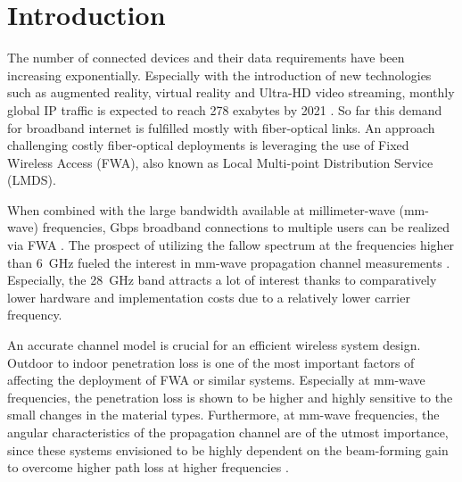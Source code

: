 \documentclass[conference]{IEEEtran}
\begin{document}
\section{Introduction}

The number of connected devices and their data requirements have been increasing exponentially. Especially with the introduction of new technologies such as augmented reality, virtual reality and Ultra-HD video streaming, monthly global IP traffic is expected to reach 278 exabytes by 2021 \cite{forecast2017cisco}. So far this demand for broadband internet is fulfilled mostly with fiber-optical links. An approach challenging costly fiber-optical deployments is leveraging the use of Fixed Wireless Access (FWA), also known as Local Multi-point Distribution Service (LMDS). 

When combined with the large bandwidth available at millimeter-wave (mm-wave) frequencies, Gbps broadband connections to multiple users can be realized via FWA \cite{pi2016millimeter} \cite{wells2009faster}. The prospect of utilizing the fallow spectrum at the frequencies higher than \SI{6}{GHz} fueled the interest in mm-wave propagation channel measurements \cite{papazian1997study} \cite{Molisch_2016_eucap} \cite{rappaport2013millimeter}. Especially, the \SI{28}{GHz} band attracts a lot of interest thanks to comparatively lower hardware and implementation costs due to a relatively lower carrier frequency.

An accurate channel model is crucial for an efficient wireless system design. Outdoor to indoor penetration loss is one of the most important factors of affecting the deployment of FWA or similar systems. Especially at mm-wave frequencies, the penetration loss is shown to be higher and highly sensitive to the small changes in the material types. Furthermore, at mm-wave frequencies, the angular characteristics of the propagation channel are of the utmost importance, since these systems envisioned to be highly dependent on the beam-forming gain to overcome higher path loss at higher frequencies \cite{Roh2014millimeter}.
\end{document}
